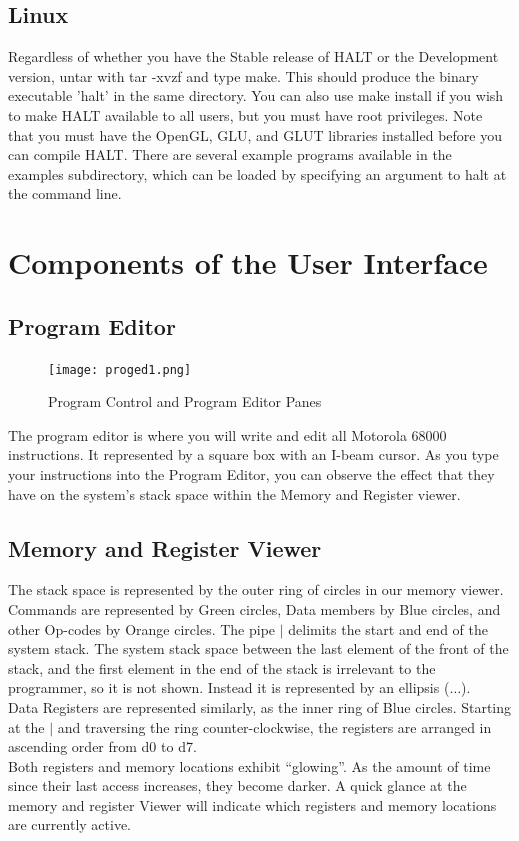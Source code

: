 \documentclass[10pt,fullpage]{article}
\begin{document}
\subsection*{Linux}
Regardless of whether you have the Stable release of HALT or the
Development version, untar with tar -xvzf and type make. This should
produce the binary executable 'halt' in the same directory. You can
also use make install if you wish to make HALT available to all
users, but you must have root privileges. Note that you must have
the OpenGL, GLU, and GLUT libraries installed before you can compile
HALT. There are several example programs available in the examples
subdirectory, which can be loaded by specifying an argument to halt
at the command line.


\section*{Components of the User Interface}

\subsection*{Program Editor}
\begin{figure}[h]
  \begin{center}
    \texttt{[image: proged1.png]}
    \caption{Program Control and Program Editor Panes}
  \end{center}
\end{figure}
The program editor is where you will write and edit all Motorola
68000 instructions. It represented by a square box with an I-beam
cursor. As you type your instructions into the Program Editor, you
can observe the effect that they have on the system's stack space
within the Memory and Register viewer.

\subsection*{Memory and Register Viewer}
The stack space is represented by the outer ring of circles in our
memory viewer. Commands are represented by Green circles, Data
members by Blue circles, and other Op-codes by Orange circles. The
pipe $|$ delimits the start and end of the system stack. The system
stack space between the last element of the front of the stack, and
the first element in the end of the stack is irrelevant to the
programmer, so it is not shown. Instead it is represented by an
ellipsis ($\ldots$).\\
Data Registers are represented similarly, as the inner ring of Blue
circles. Starting at the $|$ and traversing the ring
counter-clockwise, the registers are arranged in ascending order
from d0 to d7. \\
Both registers and memory locations exhibit ``glowing''. As the
amount of time since their last access increases, they become
darker. A quick glance at the memory and register Viewer will
indicate which registers and memory locations are currently
active.\\
\end{document}

